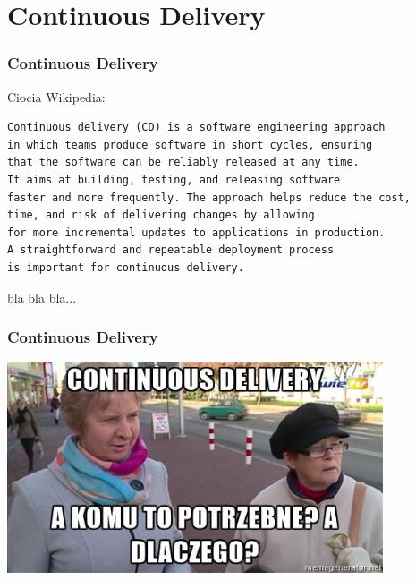 \documentclass[10pt]{beamer}
\begin{document}
\section{Continuous Delivery}
\begin{frame}[fragile]
\frametitle{Continuous Delivery}
Ciocia Wikipedia:\\
\begin{verbatim}
Continuous delivery (CD) is a software engineering approach
in which teams produce software in short cycles, ensuring
that the software can be reliably released at any time.
It aims at building, testing, and releasing software
faster and more frequently. The approach helps reduce the cost,
time, and risk of delivering changes by allowing
for more incremental updates to applications in production.
A straightforward and repeatable deployment process
is important for continuous delivery.
\end{verbatim}
\pause
bla bla bla...
\end{frame}
\begin{frame}
\frametitle{Continuous Delivery}
\includegraphics[width=30em]{a-komu.png}
\end{frame}
\end{document}
